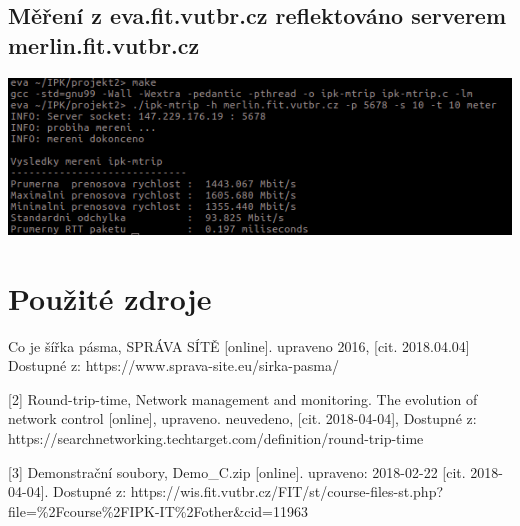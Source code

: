 \documentclass[11pt]{article}
\begin{document}
	\subsection{Měření z eva.fit.vutbr.cz reflektováno serverem merlin.fit.vutbr.cz}
	\begin{center}
		\includegraphics[scale = 0.83]{img/mereniEvaMerlin.png}\\
	\end{center}
	

	
	\vfill
	
	\section{Použité zdroje}
	\begin{flushleft}
		[1] Co je šířka pásma, SPRÁVA SÍTĚ [online]. upraveno 2016, [cit. 2018.04.04] Dostupné z: https://www.sprava-site.eu/sirka-pasma/\par
		
		[2] Round-trip-time, Network management and monitoring. The evolution of network control [online], upraveno. neuvedeno, [cit. 2018-04-04], Dostupné z: https://searchnetworking.techtarget.com/definition/round-trip-time
		
		[3] Demonstrační soubory, Demo\_C.zip [online]. upraveno: 2018-02-22 [cit. 2018-04-04]. Dostupné z: https://wis.fit.vutbr.cz/FIT/st/course-files-st.php?file=\%2Fcourse\%2FIPK-IT\%2Fother\&cid=11963\par	
	\end{flushleft}	
\end{document}
